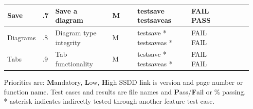 \documentclass[twoside,letterpaper]{article}
\begin{document}
\begin{landscape}
\begin{flushleft}
\begin{supertabular}[c]{|
                        m{0.9in}|m{0.4in}|m{2.0in}|
                        m{0.4in}|m{0.5in}|m{1.0in}|
                        m{1.0in}|m{1.0in}|c|
                       }
  Save
  & .7
  & Save a diagram 
  & \centering M 
  & ~ 
  & testsave \newline 
    testsaveas
  & FAIL \newline
    PASS
  & ~ \newline
    ~
  & ~ \newline
    ~
\\\hline

  Diagrams
  & .8
  & Diagram type integrity 
  & \centering M 
  & ~ 
  & testsave *\newline 
    testsaveas *
  & FAIL \newline
    FAIL
  & ~ \newline
    ~
  & ~ \newline
    ~
\\\hline

  Tabs
  & .9
  & Tab functionality 
  & \centering M 
  & ~ 
  & testsave *\newline 
    testsaveas *
  & FAIL \newline
    FAIL
  & ~ \newline
    ~
  & ~ \newline
    ~
\\\hline

\end{supertabular}
\end{flushleft}

{Priorities are: \textbf{M}andatory, \textbf{L}ow, \textbf{H}igh} \newline
{SSDD link is version and page number or function name.} \newline
{Test cases and results are file names and \textbf{P}ass/\textbf  {F}ail or \% passing.} \newline
{* asterisk indicates indirectly tested through another feature test case.}

\bigskip

\end{landscape}
\end{document}
